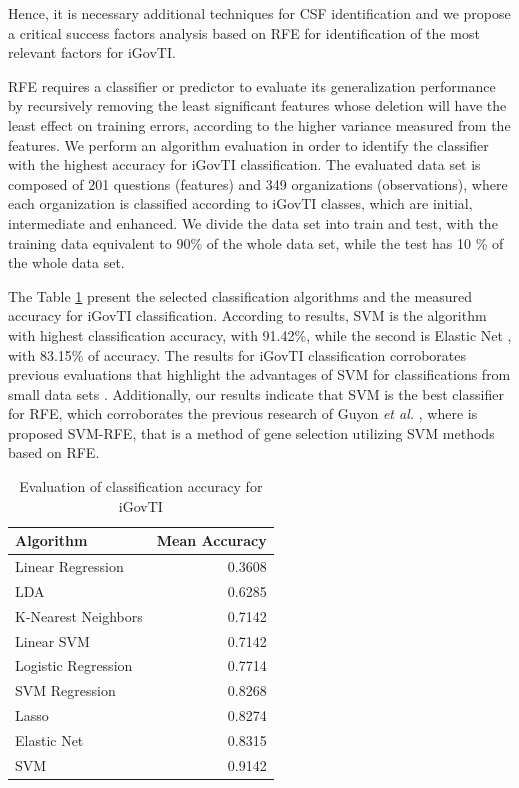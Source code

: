 Hence, it is necessary additional techniques for CSF identification and we propose a critical success factors analysis based on RFE for identification of the most relevant factors for iGovTI.

RFE requires a classifier or predictor to evaluate its generalization performance by recursively removing the least significant features whose deletion will have the least effect on training errors, according to the higher variance measured from the features. We perform an algorithm evaluation in order to identify the classifier with the highest accuracy for iGovTI classification. The evaluated data set is composed of 201 questions (features) and 349 organizations (observations), where each organization is classified according to iGovTI classes, which are initial, intermediate and enhanced. We divide the data set into train and test, with the training data equivalent to 90\% of the whole data set, while the test has 10 \% of the whole data set.

The Table \ref{tab:b_tab1} present the selected classification algorithms and the measured accuracy for iGovTI classification. According to results, SVM \cite{hearst1998support, reis2016esprit} is the algorithm with highest classification accuracy, with 91.42\%, while the second is Elastic Net \cite{zou2005regularization}, with 83.15\% of accuracy. The results for iGovTI classification corroborates previous evaluations that highlight the advantages of SVM for classifications from small data sets \cite{guyon2002gene}. Additionally, our results indicate that SVM is the best classifier for RFE, which corroborates the previous research of Guyon \emph{et al.} \cite{guyon2002gene}, where is proposed SVM-RFE, that is a method of gene selection utilizing SVM methods based on RFE. 	

\begin{table}[!t]
	\caption{Evaluation of classification accuracy for iGovTI}
  	\label{tab:b_tab1}
	\centering
	\begin{tabular}{|l|r|}
		\hline \rowcolor{Gray} Algorithm	& Mean Accuracy\\\hline
		Linear Regression \cite{draper2014applied}	&0.3608\\ \hline
		LDA \cite{martinez2001pca}	&0.6285\\ \hline
		K-Nearest Neighbors \cite{fukunaga1975branch}	&0.7142\\ \hline
		Linear SVM \cite{fan2008liblinear}	&0.7142\\ \hline
		Logistic Regression \cite{hosmer2013applied}	&0.7714\\ \hline
		SVM Regression \cite{smola2004tutorial}	&0.8268\\ \hline
		Lasso \cite{tibshirani1996regression}	&0.8274\\ \hline
		Elastic Net \cite{zou2005regularization}	&0.8315\\ \hline
		SVM \cite{hearst1998support}	&0.9142\\ \hline
	\end{tabular}
\end{table}

